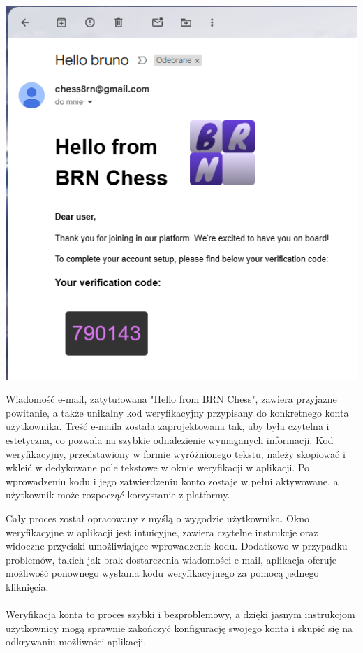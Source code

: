 \documentclass[12pt,a4paper]{article}
\begin{document}
\vspace{1cm}

\begin{minipage}[t]{0.45\textwidth} 
    \vspace{0pt} 
    \centering 
    \includegraphics[width=\linewidth]{zdj/ins_min_mail.png} 
\end{minipage} 
\hfill 
\begin{minipage}[t]{0.45\textwidth} 
    \vspace{0pt} 
    \raggedright Wiadomość e-mail, zatytułowana "Hello from BRN Chess", zawiera przyjazne powitanie, a także unikalny kod weryfikacyjny przypisany do konkretnego konta użytkownika. Treść e-maila została zaprojektowana tak, aby była czytelna i estetyczna, co pozwala na szybkie odnalezienie wymaganych informacji. Kod weryfikacyjny, przedstawiony w formie wyróżnionego tekstu, należy skopiować i wkleić w dedykowane pole tekstowe w oknie weryfikacji w aplikacji. Po wprowadzeniu kodu i jego zatwierdzeniu konto zostaje w pełni aktywowane, a użytkownik może rozpocząć korzystanie z platformy. 
\end{minipage}

\vspace{1cm}

Cały proces został opracowany z myślą o wygodzie użytkownika. Okno weryfikacyjne w aplikacji jest intuicyjne, zawiera czytelne instrukcje oraz widoczne przyciski umożliwiające wprowadzenie kodu. Dodatkowo w przypadku problemów, takich jak brak dostarczenia wiadomości e-mail, aplikacja oferuje możliwość ponownego wysłania kodu weryfikacyjnego za pomocą jednego kliknięcia.
\\\\
Weryfikacja konta to proces szybki i bezproblemowy, a dzięki jasnym instrukcjom użytkownicy mogą sprawnie zakończyć konfigurację swojego konta i skupić się na odkrywaniu możliwości aplikacji.
\end{document}
